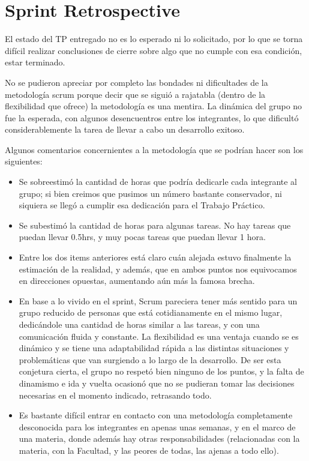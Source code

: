 \section{Sprint Retrospective}
El estado del TP entregado no es lo esperado ni lo solicitado, por lo que se torna difícil realizar conclusiones de cierre sobre algo que no cumple con esa condición, estar terminado. 

No se pudieron apreciar por completo las bondades ni dificultades de la metodología scrum porque decir que se siguió a rajatabla (dentro de la flexibilidad que ofrece) la metodología es una mentira. La dinámica del grupo no fue la esperada, con algunos desencuentros entre los integrantes, lo que dificultó considerablemente la tarea de llevar a cabo un desarrollo exitoso.

Algunos comentarios concernientes a la metodología que se podrían hacer son los siguientes:
\begin{itemize}
 \item Se sobreestimó la cantidad de horas que podría dedicarle cada integrante al grupo; si bien creimos que pusimos un número bastante conservador, ni siquiera se llegó a cumplir esa dedicación para el Trabajo Práctico. 
 \item Se subestimó la cantidad de horas para algunas tareas. No hay tareas que puedan llevar 0.5hrs, y muy pocas tareas que puedan llevar 1 hora. 
 \item Entre los dos items anteriores está claro cuán alejada estuvo finalmente la estimación de la realidad, y además, que en ambos puntos nos equivocamos en direcciones opuestas, aumentando aún más la famosa brecha.
 \item En base a lo vivido en el sprint, Scrum pareciera tener más sentido para un grupo reducido de personas que está cotidianamente en el mismo lugar, dedicándole una cantidad de horas similar a las tareas, y con una comunicación fluida y constante. La flexibilidad es una ventaja cuando se es dinámico y se tiene una adaptabilidad rápida a las distintas situaciones y problemáticas que van surgiendo a lo largo de la desarrollo. De ser esta conjetura cierta, el grupo no respetó bien ninguno de los puntos, y la falta de dinamismo e ida y vuelta ocasionó que no se pudieran tomar las decisiones necesarias en el momento indicado, retrasando todo.
 \item Es bastante difícil entrar en contacto con una metodología completamente desconocida para los integrantes en apenas unas semanas, y en el marco de una materia, donde además hay otras responsabilidades (relacionadas con la materia, con la Facultad, y las peores de todas, las ajenas a todo ello).
\end{itemize}


